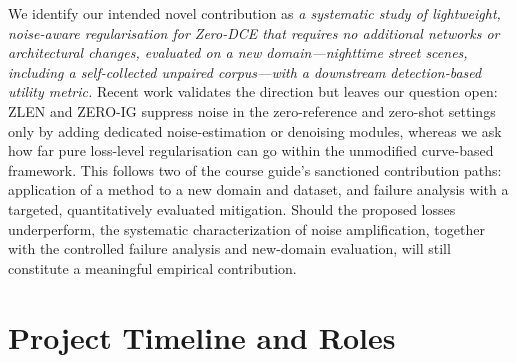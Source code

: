 \documentclass[11pt, letterpaper]{article}
\begin{document}
We identify our intended novel contribution as \textit{a systematic study of lightweight, noise-aware regularisation for Zero-DCE that requires no additional networks or architectural changes, evaluated on a new domain---nighttime street scenes, including a self-collected unpaired corpus---with a downstream detection-based utility metric.} Recent work validates the direction but leaves our question open: ZLEN and ZERO-IG suppress noise in the zero-reference and zero-shot settings only by adding dedicated noise-estimation or denoising modules, whereas we ask how far pure loss-level regularisation can go within the unmodified curve-based framework. This follows two of the course guide's sanctioned contribution paths: application of a method to a new domain and dataset, and failure analysis with a targeted, quantitatively evaluated mitigation. Should the proposed losses underperform, the systematic characterization of noise amplification, together with the controlled failure analysis and new-domain evaluation, will still constitute a meaningful empirical contribution.

\section{Project Timeline and Roles}
\end{document}
